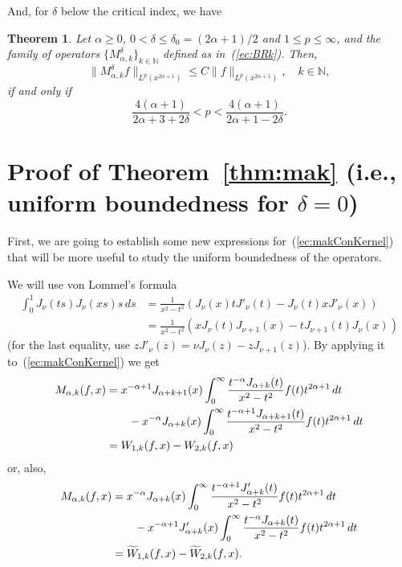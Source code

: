 \documentclass{amsart}
\newtheorem{thm}{Theorem}
\theoremstyle{remark}
\newcommand{\N}{\mathbb{N}}
\newcommand{\mak}{M_{\alpha,k}}
\newcommand{\BRk}{M_{\alpha,k}^{\delta}}
\newcommand{\lpnorm}[2]{\|{#1}\|_{L^{#2}(x^{2\alpha+1})}}
\begin{document}
And, for $\delta$ below the critical index, we have

\begin{thm}
\label{thm:debajo}
Let $\alpha\ge 0$, $0 < \delta \le \delta_0 = (2\alpha+1)/2$ and $1 \le p \le
\infty$, and the family of operators $\{\BRk\}_{k\in\N}$ defined as
in~(\ref{ec:BRk}). Then,
\begin{equation*}
    \lpnorm{\BRk f}{p} \le C \lpnorm{f}{p},
    \quad k\in \N,
\end{equation*}
if and only if
\begin{equation}
\label{ec:condprin}
    \frac{4(\alpha+1)}{2\alpha+3+2\delta}
    < p <
    \frac{4(\alpha+1)}{2\alpha+1-2\delta}.
\end{equation}
\end{thm}

\section{Proof of Theorem~\ref{thm:mak} (i.e., uniform boundedness
for $\delta=0$)}
\label{sec:mak}

First, we are going to establish some new expressions
for~(\ref{ec:makConKernel}) that will be more useful to study the uniform
boundedness of the operators.

We will use von Lommel's formula
\begin{align*}
   \int_0^1 J_\nu(ts) J_\nu(xs) s \, ds
   &= \frac{1}{x^2-t^2}
     \left( J_\nu (x) t J'_\nu (t) - J_\nu(t) x J'_\nu(x) \right) \\
   &= \frac{1}{x^2-t^2}
     \left( x J_\nu(t) J_{\nu+1}(x) - t J_{\nu+1}(t) J_\nu (x) \right)
\end{align*}
(for the last equality, use $zJ'_\nu(z) = \nu J_\nu(z) - zJ_{\nu+1}(z)$).
By applying it to~(\ref{ec:makConKernel}) we get
\begin{align}
\label{ec:makJJ}
    \mak(f,x) &=
    x^{-\alpha+1} J_{\alpha+k+1}(x)
        \int_0^\infty \frac{t^{-\alpha} J_{\alpha+k}(t)}{x^2-t^2}
          f(t) t^{2\alpha+1} \, dt \\
    &\qquad - x^{-\alpha} J_{\alpha+k}(x)
        \int_0^\infty \frac{t^{-\alpha+1} J_{\alpha+k+1}(t)}{x^2-t^2}
          f(t) t^{2\alpha+1} \, dt \notag \\
    &= W_{1,k}(f,x) - W_{2,k}(f,x) \notag
\end{align}
or, also,
\begin{align}
\label{ec:makJJ'}
    \mak(f,x) &=
    x^{-\alpha} J_{\alpha+k}(x)
        \int_0^\infty \frac{t^{-\alpha+1} J'_{\alpha+k}(t)}{x^2-t^2}
          f(t) t^{2\alpha+1} \, dt \\
    &\qquad - x^{-\alpha+1} J'_{\alpha+k}(x)
        \int_0^\infty \frac{t^{-\alpha} J_{\alpha+k}(t)}{x^2-t^2}
          f(t) t^{2\alpha+1} \, dt \notag \\
    &= \widetilde W_{1,k}(f,x) - \widetilde W_{2,k}(f,x). \notag
\end{align}
\end{document}
